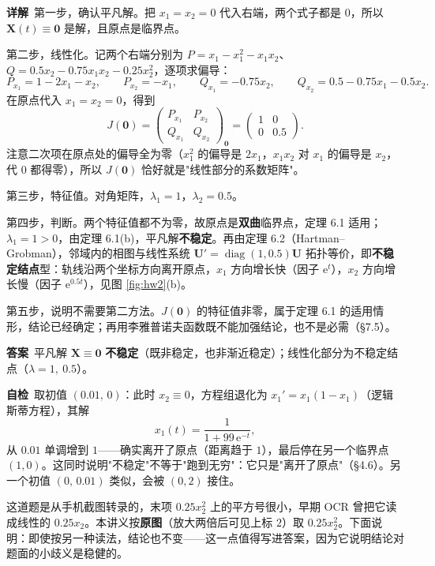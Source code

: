 \documentclass[11pt]{ctexart}
\newcommand{\X}{\mathbf{X}}\newcommand{\Y}{\mathbf{Y}}
\newcommand{\U}{\mathbf{U}}
\newcommand{\Jac}{J}
\begin{document}
\textbf{详解}\
第一步，确认平凡解。把 $x_1=x_2=0$ 代入右端，两个式子都是 $0$，所以 $\X(t)\equiv\mathbf{0}$ 是解，且原点是临界点。

第二步，线性化。记两个右端分别为 $P=x_1-x_1^{2}-x_1x_2$、$Q=0.5x_2-0.75x_1x_2-0.25x_2^{2}$，逐项求偏导：
\[
P_{x_1}=1-2x_1-x_2,\qquad P_{x_2}=-x_1,\qquad
Q_{x_1}=-0.75x_2,\qquad Q_{x_2}=0.5-0.75x_1-0.5x_2 .
\]
在原点代入 $x_1=x_2=0$，得到
\[
\Jac(\mathbf{0})=\begin{pmatrix}P_{x_1}&P_{x_2}\\Q_{x_1}&Q_{x_2}\end{pmatrix}_{\mathbf{0}}
=\begin{pmatrix}1&0\\0&0.5\end{pmatrix}.
\]
注意二次项在原点处的偏导全为零（$x_1^{2}$ 的偏导是 $2x_1$，$x_1x_2$ 对 $x_1$ 的偏导是 $x_2$，代 $0$ 都得零），所以 $\Jac(\mathbf{0})$ 恰好就是"线性部分的系数矩阵"。

第三步，特征值。对角矩阵，$\lambda_1=1$，$\lambda_2=0.5$。

第四步，判断。两个特征值都不为零，故原点是\textbf{双曲}临界点，定理 6.1 适用；$\lambda_1=1>0$，由定理 6.1(b)，平凡解\textbf{不稳定}。再由定理 6.2（Hartman--Grobman），邻域内的相图与线性系统 $\U'=\operatorname{diag}(1,0.5)\U$ 拓扑等价，即\textbf{不稳定结点}型：轨线沿两个坐标方向离开原点，$x_1$ 方向增长快（因子 $\mathrm{e}^{t}$），$x_2$ 方向增长慢（因子 $\mathrm{e}^{0.5t}$），见图 \ref{fig:hw2}(b)。

第五步，说明不需要第二方法。$\Jac(\mathbf{0})$ 的特征值非零，属于定理 6.1 的适用情形，结论已经确定；再用李雅普诺夫函数既不能加强结论，也不是必需（§7.5）。

\textbf{答案}\ 平凡解 $\X\equiv\mathbf{0}$ \textbf{不稳定}（既非稳定，也非渐近稳定）；线性化部分为不稳定结点（$\lambda=1,\ 0.5$）。

\textbf{自检}\ 取初值 $(0.01,\,0)$：此时 $x_2\equiv0$，方程组退化为 $x_1'=x_1(1-x_1)$（逻辑斯蒂方程），其解
\[
x_1(t)=\frac{1}{1+99\,\mathrm{e}^{-t}},
\]
从 $0.01$ 单调增到 $1$——确实离开了原点（距离趋于 $1$），最后停在另一个临界点 $(1,0)$。这同时说明"不稳定"不等于"跑到无穷"：它只是"离开了原点"（§4.6）。另一个初值 $(0,\,0.01)$ 类似，会被 $(0,2)$ 接住。

\newpage
{}

这道题是从手机截图转录的，末项 $0.25x_2^{2}$ 上的平方号很小，早期 OCR 曾把它读成线性的 $0.25x_2$。本讲义按\textbf{原图}（放大两倍后可见上标 $2$）取 $0.25x_2^{2}$。下面说明：即使按另一种读法，结论也不变——这一点值得写进答案，因为它说明结论对题面的小歧义是稳健的。
\end{document}
